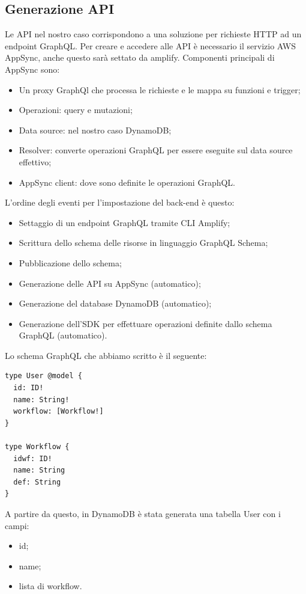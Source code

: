 \subsection{Generazione API}
Le API nel nostro caso corrispondono a una soluzione per richieste HTTP ad un endpoint GraphQL.
Per creare e accedere alle API è necessario il servizio AWS AppSync, anche questo sarà settato da amplify.
Componenti principali di AppSync sono:
\begin{itemize}
\item Un proxy GraphQl che processa le richieste e le mappa su funzioni e trigger;
\item Operazioni: query e mutazioni;
\item Data source: nel nostro caso DynamoDB;
\item Resolver: converte operazioni GraphQL per essere eseguite sul data source effettivo;
\item AppSync client: dove sono definite le operazioni GraphQL.
\end{itemize}
L'ordine degli eventi per l'impostazione del back-end è questo:

\begin{itemize}
\item Settaggio di un endpoint GraphQL tramite CLI Amplify;
\item Scrittura dello schema delle risorse in linguaggio GraphQL Schema;
\item Pubblicazione dello schema;
\item Generazione delle API su AppSync (automatico);
\item Generazione del database DynamoDB (automatico);
\item Generazione dell'SDK per effettuare operazioni definite dallo schema GraphQL (automatico).
\end{itemize}

Lo schema GraphQL che abbiamo scritto è il seguente:
\begin{verbatim}
type User @model {
  id: ID!
  name: String!
  workflow: [Workflow!]
}

type Workflow {
  idwf: ID!
  name: String
  def: String
}
\end{verbatim}


A partire da questo, in DynamoDB è stata generata una tabella User con i campi:
\begin{itemize}
\item id;
\item name;
\item lista di workflow.
\end{itemize}

